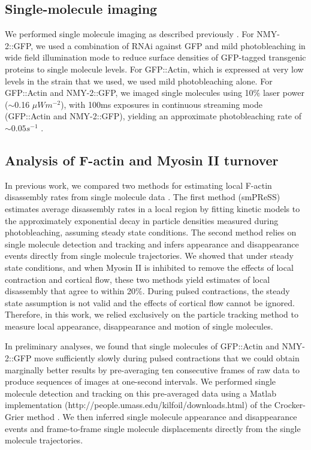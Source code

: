 \subsection{Single-molecule imaging}
We performed single molecule imaging as described previously  \cite{Robin:2014jf}. For NMY-2::GFP, we used a combination of RNAi against GFP and mild photobleaching in wide field illumination mode to reduce surface densities of GFP-tagged transgenic proteins to single molecule levels. For GFP::Actin, which is expressed at very low levels in the strain that we used, we used mild photobleaching alone. For GFP::Actin and NMY-2::GFP, we imaged single molecules using 10$\%$ laser power ($\sim$0.16 $\mu Wm^{-2}$), with 100ms exposures in continuous streaming mode (GFP::Actin and NMY-2::GFP), yielding an approximate photobleaching rate of $\sim0.05s^{-1}$  \cite{Robin:2014jf}.


\subsection{Analysis of F-actin and Myosin II turnover}
In previous work, we compared two methods for estimating local F-actin disassembly rates from single molecule data  \cite{Robin:2014jf}. The first method (smPReSS) estimates average disassembly rates in a local region by fitting kinetic models to the approximately exponential decay in particle densities measured during photobleaching, assuming steady state conditions.  The second method relies on single molecule detection and tracking and infers appearance and disappearance events directly from single molecule trajectories.  We showed that under steady state conditions, and when Myosin II is inhibited to remove the effects of local contraction and cortical flow, these two methods yield estimates of local disassembly that agree to within 20$\%$.   During pulsed contractions, the steady state assumption is not valid and the  effects of cortical flow cannot be ignored.  Therefore, in this work, we relied exclusively on the particle tracking method to measure local appearance, disappearance and motion of single molecules.

In preliminary analyses, we found that single molecules of GFP::Actin and NMY-2::GFP move sufficiently slowly during pulsed contractions that we could obtain marginally better results by pre-averaging ten consecutive frames of raw data to produce sequences of images at one-second intervals.  We performed single molecule detection and tracking on this pre-averaged data using a Matlab implementation (http://people.umass.edu/kilfoil/downloads.html) of the Crocker-Grier method  \cite{Crocker:1996wpa, Pelletier:2009tp}. We then inferred single molecule appearance and disappearance events and frame-to-frame single molecule displacements directly from the single molecule trajectories.



